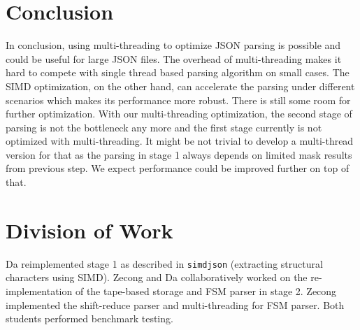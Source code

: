 \documentclass[11pt]{article}
\begin{document}
\section{Conclusion}

In conclusion, using multi-threading to optimize JSON parsing is possible and could be useful for large JSON files. The overhead of multi-threading makes it hard to compete with single thread based parsing algorithm on small cases. The SIMD optimization, on the other hand, can accelerate the parsing under different scenarios which makes its performance more robust. There is still some room for further optimization. With our multi-threading optimization, the second stage of parsing is not the bottleneck any more and the first stage currently is not optimized with multi-threading. It might be not trivial to develop a multi-thread version for that as the parsing in stage 1 always depends on limited mask results from previous step. We expect performance could be improved further on top of that.

\section{Division of Work}

Da reimplemented stage 1 as described in \texttt{simdjson} (extracting structural characters using SIMD). Zecong and Da collaboratively worked on the re-implementation of the tape-based storage and FSM parser in stage 2. Zecong implemented the shift-reduce parser and multi-threading for FSM parser. Both students performed benchmark testing.



\end{document}

